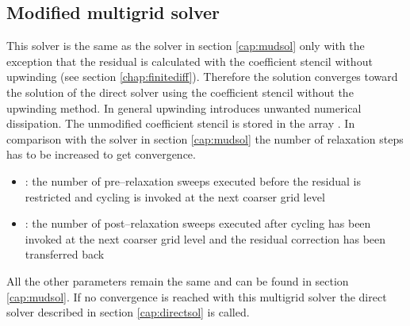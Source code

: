 \subsection{Modified multigrid solver }\label{cap:modmudsol}
%
This solver is the same as the solver in section \ref{cap:mudsol} only with the
exception that the residual is calculated with the coefficient
stencil without upwinding (see section \ref{chap:finitediff}). Therefore 
the solution converges toward 
the solution of the direct solver using the 
coefficient stencil without the upwinding method.
In general upwinding introduces unwanted numerical dissipation. 
The unmodified
coefficient stencil is stored in the array . 
In comparison with the solver in
section \ref{cap:mudsol} the number of relaxation
steps has to be increased to get convergence.
%
\begin{itemize}
    \item {}: the number of pre--relaxation 
      sweeps executed before the
      residual is restricted and cycling is invoked at the next
      coarser grid level
    \item {}: the number of post--relaxation sweeps executed after cycling
      has been invoked at the next coarser grid level and the residual
      correction has been transferred back
\end{itemize}
%
All the other parameters remain the same and can be found in section 
\ref{cap:mudsol}.
If no convergence is reached with this multigrid solver the direct
solver described in section \ref{cap:directsol} is called.
%

